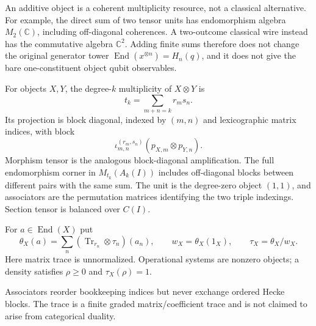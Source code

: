\begin{remark}
An additive object is a coherent multiplicity resource, not a classical
alternative.  For example, the direct sum of two tensor units has
endomorphism algebra $M_2(\mathbb C)$, including off-diagonal coherences.  A
two-outcome classical wire instead has the commutative algebra
$\mathbb C^2$.  Adding finite sums therefore does not change the original
generator tower $\operatorname{End}(x^{\otimes n})=H_n(q)$, and it does not
give the bare one-constituent object qubit observables.
\end{remark}

\begin{definition}
For objects $X,Y$, the degree-$k$ multiplicity of $X\otimes Y$ is
\[
 t_k=\sum_{m+n=k}r_ms_n.
\]
Its projection is block diagonal, indexed by $(m,n)$ and lexicographic
matrix indices, with block
\[
 \iota_{m,n}^{(r_m,s_n)}(p_{X,m}\otimes p_{Y,n}).
\]
Morphism tensor is the analogous block-diagonal amplification.  The full
endomorphism corner in $M_{t_k}(A_k(I))$ includes off-diagonal blocks between
different pairs with the same sum.  The unit is the degree-zero object
$(1,1)$, and associators are the permutation matrices identifying the two
triple indexings.  Section tensor is balanced over $C(I)$.

For $a\in\operatorname{End}(X)$ put
\[
 \theta_X(a)=\sum_n(\operatorname{Tr}_{r_n}\otimes\tau_{n})(a_n),
 \qquad w_X=\theta_X(1_X),\qquad \tau_X=\theta_X/w_X.
\]
Here matrix trace is unnormalized.  Operational systems are nonzero objects;
a density satisfies $\rho\geq0$ and $\tau_X(\rho)=1$.
\end{definition}
\begin{scope}
Associators reorder bookkeeping indices but never exchange ordered Hecke
blocks.  The trace is a finite graded matrix/coefficient trace and is not
claimed to arise from categorical duality.
\end{scope}

